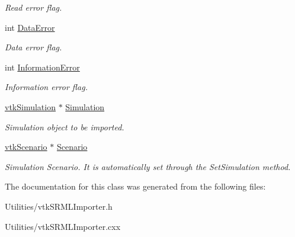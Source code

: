 \begin{DoxyCompactItemize}
\begin{DoxyCompactList}\small\item\em Read error flag. \item\end{DoxyCompactList}\item 
\hypertarget{classvtkSRMLImporter_ac2c32411de689f5dfed773e60b781b2b}{
int \hyperlink{classvtkSRMLImporter_ac2c32411de689f5dfed773e60b781b2b}{DataError}}
\label{classvtkSRMLImporter_ac2c32411de689f5dfed773e60b781b2b}

\begin{DoxyCompactList}\small\item\em Data error flag. \item\end{DoxyCompactList}\item 
\hypertarget{classvtkSRMLImporter_a37fc532df5f0f9799ca43ddb1032cacb}{
int \hyperlink{classvtkSRMLImporter_a37fc532df5f0f9799ca43ddb1032cacb}{InformationError}}
\label{classvtkSRMLImporter_a37fc532df5f0f9799ca43ddb1032cacb}

\begin{DoxyCompactList}\small\item\em Information error flag. \item\end{DoxyCompactList}\item 
\hypertarget{classvtkSRMLImporter_ab0512ee42e60dd8862b8615d5bbecae7}{
\hyperlink{classvtkSimulation}{vtkSimulation} $\ast$ \hyperlink{classvtkSRMLImporter_ab0512ee42e60dd8862b8615d5bbecae7}{Simulation}}
\label{classvtkSRMLImporter_ab0512ee42e60dd8862b8615d5bbecae7}

\begin{DoxyCompactList}\small\item\em Simulation object to be imported. \item\end{DoxyCompactList}\item 
\hypertarget{classvtkSRMLImporter_a8b939d3cfd5cfbfeaf8cc267afdc31e7}{
\hyperlink{classvtkScenario}{vtkScenario} $\ast$ \hyperlink{classvtkSRMLImporter_a8b939d3cfd5cfbfeaf8cc267afdc31e7}{Scenario}}
\label{classvtkSRMLImporter_a8b939d3cfd5cfbfeaf8cc267afdc31e7}

\begin{DoxyCompactList}\small\item\em Simulation Scenario. It is automatically set through the SetSimulation method. \item\end{DoxyCompactList}\end{DoxyCompactItemize}


The documentation for this class was generated from the following files:\begin{DoxyCompactItemize}
\item 
Utilities/vtkSRMLImporter.h\item 
Utilities/vtkSRMLImporter.cxx\end{DoxyCompactItemize}
